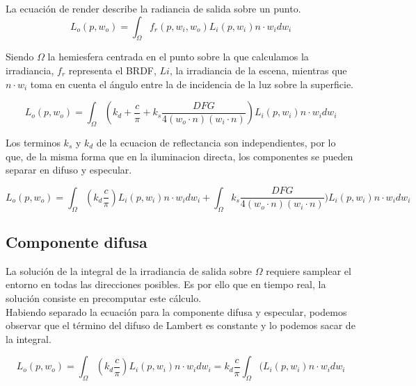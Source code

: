    La ecuaci\'on de render describe la radiancia de salida sobre un punto.
    \begin{equation}
    L_o(p, w_o) = \int_{\Omega} f_r(p, w_i, w_o)L_i(p, w_i)n\cdot{w_i}dw_i
    \end{equation}
    \singlespacing
    
    Siendo $\Omega$ la hemiesfera centrada en el punto sobre la que calculamos la irradiancia,
    $f_r$ representa el BRDF, $Li$, la irradiancia de la escena, mientras que $n\cdot{w_i}$ toma en
    cuenta el \'angulo entre la de incidencia de la luz sobre la superficie.
    
    \begin{equation}
    L_o(p, w_o) = \int_{\Omega} (k_d + \frac{c}{\pi} + 
    k_s \frac{DFG}{4(w_o\cdot{n})(w_i\cdot{n})})L_i(p, w_i)n\cdot{w_i}dw_i
    \end{equation}
    \singlespacing
    
    Los terminos $k_s$ y $k_d$ de la ecuacion de reflectancia son independientes, por lo que, de la
    misma forma que en la iluminacion directa, los componentes se pueden separar en difuso y
    especular.
    
    \begin{equation}
    L_o(p, w_o) = \int_{\Omega}
    (k_d \frac{c}{\pi}) L_i(p, w_i)n\cdot{w_i}dw_i +
    \int_{\Omega} 
    k_s \frac{DFG}{4(w_o\cdot{n})(w_i\cdot{n})})L_i(p, w_i)n\cdot{w_i}dw_i
    \end{equation}
    \singlespacing
    
        \subsection{Componente difusa}
        La soluci\'on de la integral de la irradiancia de salida sobre $\Omega$ requiere samplear el entorno
        en todas las direcciones posibles. Es por ello que en tiempo real, la soluci\'on consiste en
        precomputar este c\'alculo.\\
    
        Habiendo separado la ecuaci\'on para la componente difusa y especular, podemos observar que el t\'ermino del difuso
        de Lambert es constante y lo podemos sacar de la integral.
    
        \begin{equation}
        L_o(p, w_o) = \int_{\Omega}
        (k_d \frac{c}{\pi}) L_i(p, w_i)n\cdot{w_i}dw_i=
        k_d \frac{c}{\pi} \int_{\Omega}
        (L_i(p, w_i)n\cdot{w_i}dw_i
        \end{equation}
        \singlespacing
    
